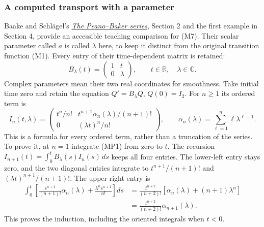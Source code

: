 \documentclass[
  11pt,
]{article}
\begin{document}
\subsubsection{A computed transport with a
parameter}\label{a-computed-transport-with-a-parameter}

Baake and Schlägel's \href{https://arxiv.org/abs/1011.1775v3}{\emph{The
Peano--Baker series}}, Section 2 and the first example in Section 4,
provide an accessible teaching comparison for (M7). Their scalar
parameter called \(a\) is called \(\lambda\) here, to keep it distinct
from the original transition function (M1). Every entry of their
time-dependent matrix is retained: \[
 B_\lambda(t)=\begin{pmatrix}1&t\\0&\lambda\end{pmatrix},
 \qquad t\in\mathbb R,\quad\lambda\in\mathbb C.
 \tag{MP1}
\] Complex parameters mean their two real coordinates for smoothness.
Take initial time zero and retain the equation \(Q'=B_\lambda Q\),
\(Q(0)=I_2\). For \(n\geq1\) its ordered term is \[
 I_n(t,\lambda)=
 \begin{pmatrix}
 t^n/n!&t^{n+1}\alpha_n(\lambda)/(n+1)!\\
 0&(\lambda t)^n/n!
 \end{pmatrix},\qquad
 \alpha_n(\lambda)=\sum_{\ell=1}^n\ell\lambda^{\ell-1}.
 \tag{MP2}
\] This is a formula for every ordered term, rather than a truncation of
the series. To prove it, at \(n=1\) integrate (MP1) from zero to \(t\).
The recursion \(I_{n+1}(t)=\int_0^tB_\lambda(s)I_n(s)\,ds\) keeps all
four entries. The lower-left entry stays zero, and the two diagonal
entries integrate to \(t^{n+1}/(n+1)!\) and
\((\lambda t)^{n+1}/(n+1)!\). The upper-right entry is \[
 \begin{aligned}
 \int_0^t\left[
 \frac{s^{n+1}}{(n+1)!}\alpha_n(\lambda)
 +\frac{\lambda^n s^{n+1}}{n!}\right]ds
 &=\frac{t^{n+2}}{(n+2)!}
   \left[\alpha_n(\lambda)+(n+1)\lambda^n\right]\\
 &=\frac{t^{n+2}}{(n+2)!}\alpha_{n+1}(\lambda).
 \end{aligned}
 \tag{MP3}
\] This proves the induction, including the oriented integrals when
\(t<0\).
\end{document}
